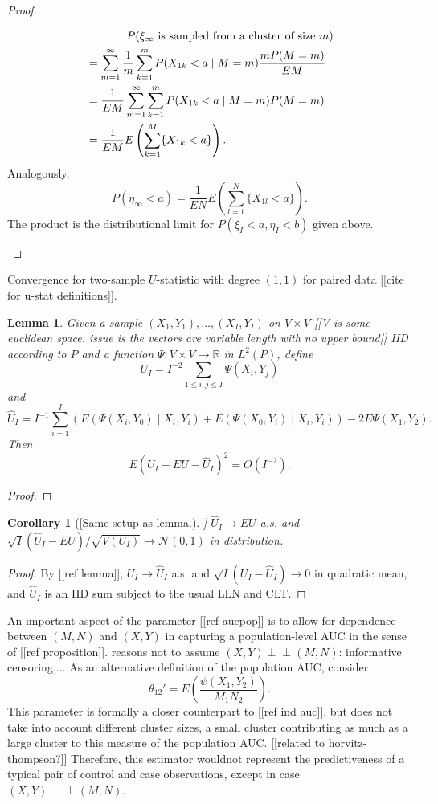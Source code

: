 \message{ !name(manuscript.tex)}\documentclass[12pt]{article}
\DeclareMathOperator{\AUC}{AUC}
\DeclareMathOperator{\V}{Var}
\newcommand{\I}{I}
\newcommand{\E}{E}
\renewcommand{\P}{P}
\newcommand{\cind}{\perp \!\!\! \perp}
\newcommand{\aucpop}{\theta_{12}}%
\newcommand{\Kernel}{\Psi}
\renewcommand{\V}{V}
\newtheorem{lemma}[theorem]{Lemma}
\newtheorem{corollary}[theorem]{Corollary}
\begin{document}
\begin{proof}
\begin{enumerate}
\begin{align}
        &\hspace{.5in}\P(\xi_\infty\text{ is sampled from a cluster of size }m)\\
                           &= \sum_{m=1}^\infty\frac{1}{m}\sum_{k=1}^m\P(X_{1k}<a\mid M=m)\frac{m\P(M=m)}{\E M}\\
                           &=\frac{1}{\E M}\sum_{m=1}^\infty\sum_{k=1}^m\P(X_{1k}<a\mid M=m)\P(M=m)\\
        &=\frac{1}{\E M}\E\left(\sum_{k=1}^M\{X_{1k}<a\}\right).
      \end{align}
      Analogously,
      $$
      \P(\eta_\infty < a)=\frac{1}{\E N}\E\left(\sum_{l=1}^N\{X_{1l}<a\}\right).
      $$
      The product is the distributional limit for
      $\P(\xi_\I<a,\eta_\I<b)$ given above.
    \end{enumerate}
  \end{proof}
  
  Convergence for two-sample $U$-statistic with degree $(1,1)$ for
  paired data [[cite for u-stat definitions]].
  \begin{lemma} Given a sample $(X_1,Y_1),\ldots,(X_\I,Y_\I)$ on
    $\V\times\V$ [[V is some euclidean space. issue is the vectors are
    variable length with no upper bound]] IID according to $\P$ and a
    function $\Kernel: \V\times\V \to \mathbb{R}$ in $L^2(\P)$, define
    $$
    U_\I = \I^{-2}\sum_{1\le i,j\le\I}\Kernel(X_i,Y_j)
    $$
    and
    $$
    \hat{U}_\I = \I^{-1}\sum_{i=1}^\I\left(\E(\Kernel(X_i,Y_0)\mid X_i,Y_i) + \E(\Kernel(X_0,Y_i)\mid X_i,Y_i)\right) - 2\E\Kernel(X_1,Y_2).
    $$
    Then
    $$
    \E(U_\I-\E U-\hat{U}_\I)^2=O(\I^{-2}).
    $$
  \end{lemma}
  \begin{proof}
  \end{proof}
  \begin{corollary}
    [[Same setup as lemma.]] $\hat U_\I\to\E U$ a.s. and $\sqrt{\I}(\hat U_\I-\E U)/\sqrt{\V(U_\I)}\to\mathcal{N}(0,1)$ in distribution.
  \end{corollary}
  \begin{proof}
    By [[ref lemma]], $U_\I\to\hat{U}_\I$ a.s. and $\sqrt{\I}(U_\I-\hat{U}_\I)\to 0$ in quadratic mean, and $\hat{U}_\I$ is an IID sum subject to the usual LLN and CLT.
  \end{proof}


  An important aspect of the parameter [[ref aucpop]] is to allow for
  dependence between $(M,N)$ and $(X,Y)$ in capturing a
  population-level AUC in the sense of [[ref proposition]]. reasons
  not to assume $(X,Y)\cind (M,N)$: informative censoring,... As an alternative definition of the population AUC, consider
  $$
  \aucpop'=\E\left(\frac{\psi(X_1,Y_2)}{M_1N_2} \right).
  $$
This parameter is formally a closer counterpart to [[ref ind auc]], but does not
  take into account different cluster sizes, a small cluster
  contributing as much as a large cluster to this measure of the
  population AUC. [[related to horvitz-thompson?]] Therefore, this
  estimator wouldnot represent the predictiveness of a typical pair of
  control and case observations, except in case $(X,Y)\cind (M,N)$.
\end{document}
